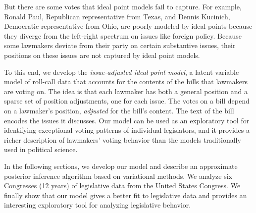 But there are some votes that ideal point models fail to capture.  For
example, Ronald Paul, Republican representative from Texas, and Dennis
Kucinich, Democratic representative from Ohio, are poorly modeled by
ideal points because they diverge from the left-right spectrum on
issues like foreign policy. Because some lawmakers deviate from their
party on certain substantive issues, their positions on these issues
are not captured by ideal point models.

%



To this end, we develop the \emph{issue-adjusted ideal point model}, a
latent variable model of roll-call data that accounts for the contents
of the bills that lawmakers are voting on.  The idea is that each
lawmaker has both a general position and a sparse set of position
adjustments, one for each issue.  The votes on a bill depend on a
lawmaker's position, \emph{adjusted} for the bill's content.  The text
of the bill encodes the issues it discusses. Our model can be used as
an exploratory tool for identifying exceptional voting patterns of
individual legislators, and it provides a richer description of
lawmakers' voting behavior than the models traditionally used in
political science.


In the following sections, we develop our model and describe an
approximate posterior inference algorithm based on variational
methods.  We analyze six Congresses (12 years) of legislative data
from the United States Congress.  We finally show that our model gives
a better fit to legislative data and provides an interesting
exploratory tool for analyzing legislative behavior.


